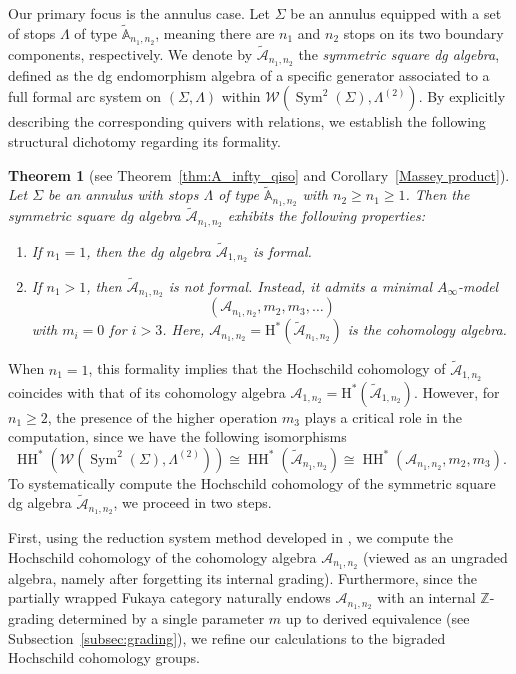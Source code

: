 \documentclass[a4paper, reqno, 11pt]{amsart}
\newtheorem{theorem}{Theorem}[section]
\theoremstyle{definition}
\begin{document}
	Our primary focus is the annulus case. Let $\Sigma$ be an annulus equipped with a set of stops $\Lambda$ of type $\widetilde{\mathbb{A}}_{n_1,n_2}$, meaning there are $n_1$ and $n_2$ stops on its two boundary components, respectively. We denote by $\widetilde{\mathcal{A}}_{n_1,n_2}$ the \emph{symmetric square dg algebra}, defined as the dg endomorphism algebra of a specific generator associated to a full formal arc system on $(\Sigma, \Lambda)$ within $\mathcal{W}(\operatorname{Sym}^2(\Sigma), \Lambda^{(2)})$. By explicitly describing the corresponding quivers with relations, we establish the following structural dichotomy regarding its formality.
	
	\begin{theorem}[see Theorem~\ref{thm:A_infty_qiso} and Corollary~\ref{Massey product}]
		Let $\Sigma$ be an annulus with stops $\Lambda$ of type $\widetilde{\mathbb{A}}_{n_1,n_2}$ with $n_2\geq n_1 \geq 1$. Then the symmetric square dg algebra $\widetilde{\mathcal{A}}_{n_1,n_2}$ exhibits the following properties:
		\begin{enumerate}
			\item If $n_1 = 1$, then the dg algebra $\widetilde{\mathcal{A}}_{1,n_2}$ is formal.
			\item If $n_1 >1$, then $\widetilde{\mathcal{A}}_{n_1,n_2}$ is not formal. Instead, it admits a minimal $A_\infty$-model $$(\mathcal{A}_{n_1,n_2}, m_2, m_3, \dots)$$ with $m_i = 0$ for $i>3$. Here, $\mathcal{A}_{n_1,n_2} = \mathrm{H}^*(\widetilde{\mathcal{A}}_{n_1,n_2})$ is the cohomology algebra. 
		\end{enumerate}
	\end{theorem}
	
	When $n_1=1$, this formality implies that the Hochschild cohomology of $\widetilde{\mathcal{A}}_{1,n_2}$ coincides with that of its cohomology algebra $\mathcal{A}_{1,n_2} = \mathrm{H}^*(\widetilde{\mathcal{A}}_{1,n_2})$. However, for $n_1 \ge 2$, the presence of the higher operation $m_3$ plays a critical role in the computation, since we have the following isomorphisms 
	$$\operatorname{HH}^*(\mathcal{W}(\operatorname{Sym}^2(\Sigma), \Lambda^{(2)})) \cong \operatorname{HH}^*(\widetilde{\mathcal{A}}_{n_1,n_2}) \cong \operatorname{HH}^*(\mathcal A_{n_1,n_2}, m_2, m_3).$$
	To systematically compute the Hochschild cohomology of the symmetric square dg algebra $\widetilde{\mathcal{A}}_{n_1,n_2}$, we proceed in two steps.
	
	First, using the reduction system method developed in \cite{Chouhy-Solotar2015, Barmeier-Wang2020}, we compute the Hochschild cohomology of the cohomology algebra $\mathcal{A}_{n_1,n_2}$ (viewed as an ungraded algebra, namely after forgetting its internal
	grading). Furthermore, since the partially wrapped Fukaya category naturally endows $\mathcal{A}_{n_1,n_2}$ with an internal $\mathbb{Z}$-grading determined by a single parameter $m$ up to derived equivalence (see Subsection~\ref{subsec:grading}), we refine our calculations to the bigraded Hochschild cohomology groups.
	
\end{document}
